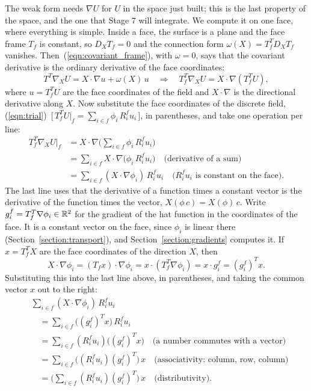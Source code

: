 The weak form needs $\nabla U$ for $U$ in the space just built; this is the last property of the space, and the one that Stage 7 will integrate. We compute it on one face, where everything is simple. Inside a face, the surface is a plane and the face frame $T_f$ is constant, so $D_X T_f = 0$ and the connection form $\omega(X) = T_f^T D_X T_f$ vanishes. Then~(\ref{eqn:covariant_frame}), with $\omega = 0$, says that the covariant derivative is the ordinary derivative of the face coordinates:
\begin{equation*}
T^T \nabla_X U = X\cdot\nabla u + \omega(X)\, u \quad\Longrightarrow\quad T_f^T\nabla_X U = X\cdot\nabla(T_f^T U) ,
\end{equation*}
where $u = T_f^TU$ are the face coordinates of the field and $X\cdot\nabla$ is the directional derivative along $X$. Now substitute the face coordinates of the discrete field, (\ref{eqn:trial})~[\,$T_f^T U|_f = \sum_{i\in f} \phi_i\, R_i^f u_i$\,], in parentheses, and take one operation per line:
\begin{align*}
T_f^T\nabla_X U\big|_f &= X\cdot\nabla \Big(\sum_{i\in f} \phi_i\, R_i^f u_i\Big) \\
&= \sum_{i\in f} X\cdot\nabla\big(\phi_i\, R_i^f u_i\big) \quad \text{(derivative of a sum)}\\
&= \sum_{i\in f} (X\cdot\nabla\phi_i)\, R_i^f u_i \quad \text{($R_i^fu_i$ is constant on the face)} .
\end{align*}
The last line uses that the derivative of a function times a constant vector is the derivative of the function times the vector, $X(\phi\, c) = X(\phi)\, c$. Write $g_i^f = T_f^T \nabla \phi_i \in \mathbb{R}^2$ for the gradient of the hat function in the coordinates of the face. It is a constant vector on the face, since $\phi_i$ is linear there (Section~\ref{section:transport}), and Section~\ref{section:gradients} computes it. If $x = T_f^T X$ are the face coordinates of the direction $X$, then
\begin{equation*}
X\cdot\nabla\phi_i = (T_f x)\cdot\nabla\phi_i = x\cdot (T_f^T\nabla\phi_i) = x \cdot g_i^f = (g_i^f)^T x .
\end{equation*}
Substituting this into the last line above, in parentheses, and taking the common vector $x$ out to the right:
\begin{align*}
&\sum_{i\in f} (X\cdot\nabla\phi_i)\, R_i^f u_i \\
&\quad= \sum_{i\in f} \big((g_i^f)^T x\big)\, R_i^f u_i \\
&\quad= \sum_{i\in f} (R_i^f u_i)\big((g_i^f)^T x\big) \quad \text{(a number commutes with a vector)}\\
&\quad= \sum_{i\in f} \big((R_i^f u_i)(g_i^f)^T\big)\, x \quad \text{(associativity: column, row, column)}\\
&\quad= \Big(\sum_{i\in f} (R_i^f u_i)(g_i^f)^T\Big)\, x \quad \text{(distributivity)} .
\end{align*}
